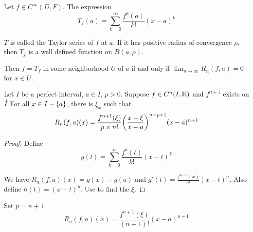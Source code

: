 \begin{definition}\label{taylor_series}
    Let $f \in C^\infty (D, F)$. The expression
    \begin{equation}
        T_f (a) = \sum_{k=0}^\infty \frac{f^k(a)}{k!}(x-a)^k
    \end{equation}
    
    $T$ is called the Taylor series of $f$ at $a$. If it has positive radius of convergence $\rho$, then $T_f$ is a well defined function on $B(a,\rho)$. 
    
    Then $f = T_f$ in some neighborhood $U$ of $a$ if and only if $\displaystyle \lim_{n \rightarrow \infty} R_n(f,a) = 0$ for $x \in U$.
\end{definition}

\begin{theorem}
    Let $I$ be a perfect interval, $a \in I$, $p > 0$. Suppose $f \in C^n(I, \mathbb{R})$ and $f^{n+1}$ exists on $\mathring{I}$.For all $x \in I - \set{a}$, there is $\xi_x$ such that
    \begin{equation}
        R_n(f,a)(x) = \frac{f^{n+1}(\xi)}{p \times n!}\mleft( \frac{x-\xi}{x-a} \mright)^{n-p+1} (x-a)^{n+1}
    \end{equation}
\end{theorem}
\begin{proof}
    Define
    \begin{equation}
        g(t) = \sum_{k=0}^n \frac{f^k (t)}{k!}(x-t)^k
    \end{equation}
    
    We have $R_n (f,a)(x) = g(x) - g(a)$ and $g'(t) = \frac{f^{n+1}(x)}{n!}(x-t)^n$. Also define $h(t) = (x-t)^p$. Use  to find the $\xi$.
\end{proof}

\begin{theorem}
    Set $p = n+1$
    \begin{equation}
        R_n (f,a)(x) = \frac{f^{n+1}(\xi)}{(n+1)!}(x-a)^{n+1}
    \end{equation}
\end{theorem}

